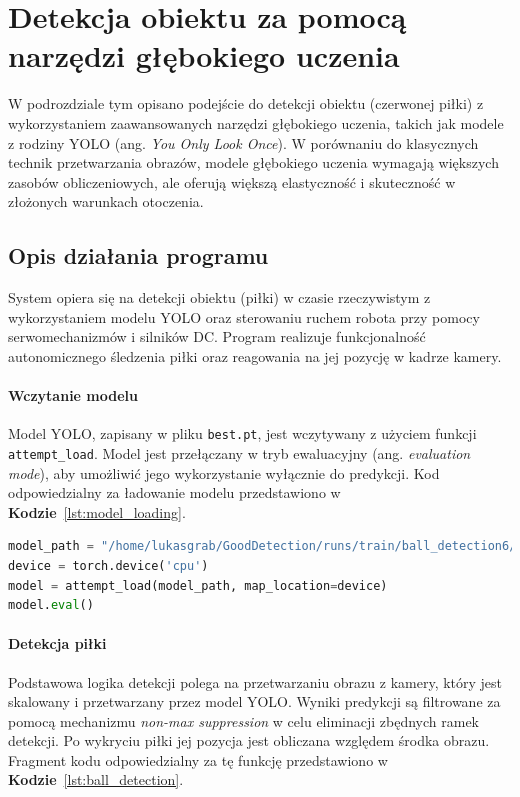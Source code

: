 \documentclass[a4paper,twoside,12pt]{book}
\begin{document}
\section{Detekcja obiektu za pomocą narzędzi głębokiego uczenia}

W podrozdziale tym opisano podejście do detekcji obiektu (czerwonej piłki) z wykorzystaniem zaawansowanych narzędzi głębokiego uczenia, takich jak modele z rodziny YOLO (ang. \textit{You Only Look Once}).
W porównaniu do klasycznych technik przetwarzania obrazów, modele głębokiego uczenia wymagają większych zasobów obliczeniowych, ale oferują większą elastyczność i skuteczność w złożonych warunkach otoczenia.

\newpage
\subsection{Opis działania programu}

System opiera się na detekcji obiektu (piłki) w czasie rzeczywistym z wykorzystaniem modelu YOLO oraz sterowaniu ruchem robota przy pomocy serwomechanizmów i silników DC. Program realizuje funkcjonalność autonomicznego śledzenia piłki oraz reagowania na jej pozycję w kadrze kamery.

\paragraph{Wczytanie modelu}
Model YOLO, zapisany w pliku \texttt{best.pt}, jest wczytywany z użyciem funkcji \texttt{attempt\_load}. Model jest przełączany w tryb ewaluacyjny (ang. \textit{evaluation mode}), aby umożliwić jego wykorzystanie wyłącznie do predykcji. Kod odpowiedzialny za ładowanie modelu przedstawiono w \textbf{Kodzie}~\ref{lst:model_loading}.

\begin{lstlisting}[language=Python, caption={Ładowanie modelu YOLO do pamięci.}, label={lst:model_loading}, captionpos=b]
model_path = "/home/lukasgrab/GoodDetection/runs/train/ball_detection6/weights/best.pt"
device = torch.device('cpu')
model = attempt_load(model_path, map_location=device)
model.eval()
\end{lstlisting}

\paragraph{Detekcja piłki}
Podstawowa logika detekcji polega na przetwarzaniu obrazu z kamery, który jest skalowany i przetwarzany przez model YOLO. Wyniki predykcji są filtrowane za pomocą mechanizmu \textit{non-max suppression} w celu eliminacji zbędnych ramek detekcji. Po wykryciu piłki jej pozycja jest obliczana względem środka obrazu. Fragment kodu odpowiedzialny za tę funkcję przedstawiono w \textbf{Kodzie}~\ref{lst:ball_detection}.
\end{document}
